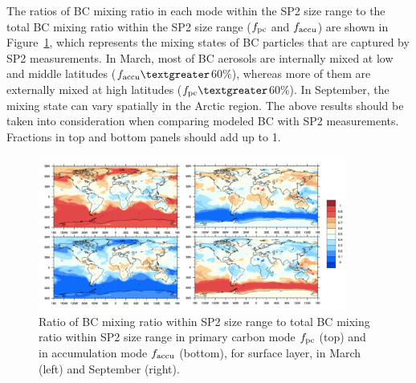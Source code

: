 \documentclass[12pt, fullpage]{uiucthesis2009}
\begin{document}
	The ratios of BC mixing ratio in each mode within the SP2 size range to the total BC mixing ratio within the SP2 size range ($f_{\rm pc}$ and $f_{\rm accu}$) are shown in Figure~\ref{fig_R7}, which represents the mixing states of BC particles that are captured by SP2 measurements. In March, most of BC aerosols are internally mixed at low and middle
	latitudes ($f_{\rm accu}\textgreater$60$\%$), whereas more of them are externally mixed at high latitudes ($f_{\rm pc}\textgreater$60$\%$). In September, the mixing state can vary spatially in the Arctic region. The above results should be taken into consideration when comparing modeled BC
	with SP2 measurements. Fractions in top and bottom panels should add up to 1.
	
	
	
	\begin{figure}[h] 
		\begin{center}
			\includegraphics[width = 0.9\textwidth]{Rplot04}
			\caption[Ratio of BC mixing ratio within SP2 size range to total BC mixing ratio within SP2 size range in primary carbon mode $f_{\rm pc}$ (top) and in accumulation mode $f_{\rm accu}$ (bottom), for surface layer, in March and September]{\label{fig_R7} Ratio of BC mixing ratio within SP2 size range to total BC mixing ratio within SP2 size range in primary carbon mode $f_{\rm pc}$ (top) and in accumulation mode $f_{\rm accu}$ (bottom), for surface layer, in March (left) and September (right).}
		\end{center}
	\end{figure}
	
	
\end{document}
